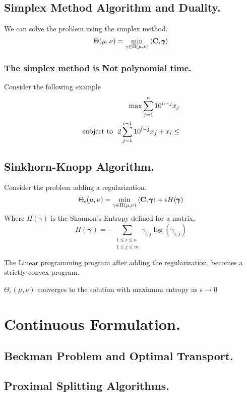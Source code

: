 \subsection{Simplex Method Algorithm and Duality.}
We can solve the problem using the simplex method.
\begin{equation}
	\Theta(\mu, \nu)=\min_{\gamma\in \Pi(\mu, \nu)}{\left\langle \mathbf{C}, \pmb{\gamma} \right\rangle}
\end{equation}
\subsubsection{The simplex method is Not polynomial time.}
Consider the following example
\begin{align}
	\max \sum_{j=1}^{n} 10^{n-j}x_j\\
	\text{subject to }\ 2\sum_{j=1}^{i-1}10^{i-j}x_j+x_i \leq 
\end{align}

\subsection{Sinkhorn-Knopp Algorithm.}
Consider the problem adding a regularization.
\begin{equation}
	\Theta_\epsilon(\mu, \nu)=\min_{\gamma\in \Pi(\mu, \nu)}{\left\langle \mathbf{C},\pmb{\gamma} \right\rangle+\epsilon H(\pmb{\gamma})}
\end{equation}
Where $H(\gamma)$ is the Shannon's Entropy defined for a matrix,
\begin{equation}
	H(\pmb{\gamma})=-\sum_{\substack{1\leq i \leq n\\ 1\leq j \leq m}}\gamma_{i,j}\log(\gamma_{i,j})
\end{equation} 

\begin{theorem}
	The Linear programming program after adding the regularization, becomes a strictly convex program.
\end{theorem}
\begin{theorem}
	$\Theta_\epsilon(\mu, \nu)$ converges to the solution with maximum entropy as $\epsilon\rightarrow 0$
\end{theorem}
\section{Continuous Formulation.}
\subsection{Beckman Problem and Optimal Transport.}
\subsection{Proximal Splitting Algorithms.}

